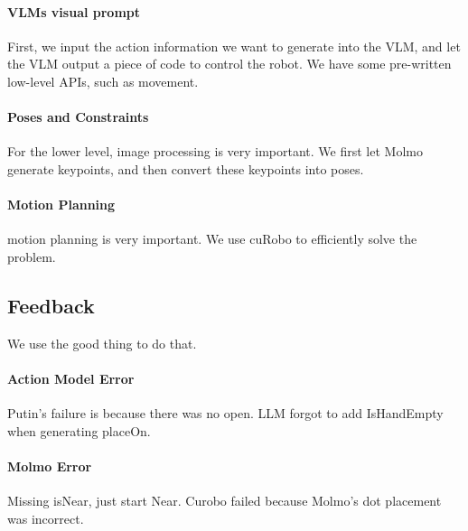 \documentclass{article}
\begin{document}
\paragraph{VLMs visual prompt}

First, we input the action information we want to generate into the VLM, and let the VLM output a piece of code to control the robot. We have some pre-written low-level APIs, such as movement.

\paragraph{Poses and Constraints}


For the lower level, image processing is very important. We first let Molmo generate keypoints, and then convert these keypoints into poses.

\paragraph{Motion Planning}

motion planning is very important. We use cuRobo to efficiently solve the problem.

\subsection{Feedback}
We use the good thing to do that.

\paragraph{Action Model Error}


Putin's failure is because there was no open.  
LLM forgot to add IsHandEmpty when generating placeOn.

\paragraph{Molmo Error}


Missing isNear, just start Near.  
Curobo failed because Molmo's dot placement was incorrect.
\end{document}
